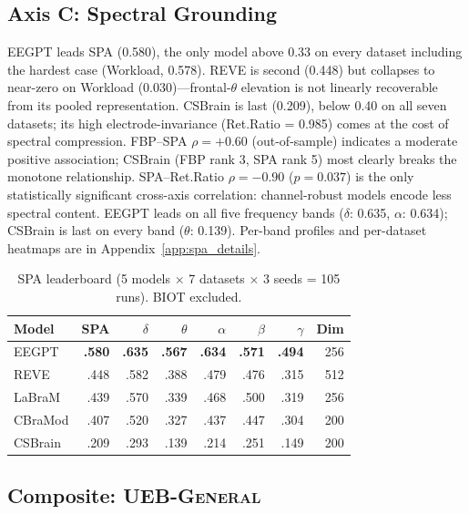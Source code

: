 \documentclass{article}
\newcommand{\uebgen}{\textsc{UEB-General}\xspace}
\begin{document}
\subsection{Axis C: Spectral Grounding}
\label{sec:results_c}

EEGPT leads SPA (0.580), the only model above 0.33 on every dataset including the hardest case (Workload, 0.578). REVE is second (0.448) but collapses to near-zero on Workload (0.030)---frontal-$\theta$ elevation is not linearly recoverable from its pooled representation. CSBrain is last (0.209), below 0.40 on all seven datasets; its high electrode-invariance (Ret.Ratio = 0.985) comes at the cost of spectral compression. FBP--SPA $\rho = +0.60$ (out-of-sample) indicates a moderate positive association; CSBrain (FBP rank 3, SPA rank 5) most clearly breaks the monotone relationship. SPA--Ret.Ratio $\rho = -0.90$ ($p = 0.037$) is the only statistically significant cross-axis correlation: channel-robust models encode less spectral content. EEGPT leads on all five frequency bands ($\delta$: 0.635, $\alpha$: 0.634); CSBrain is last on every band ($\theta$: 0.139). Per-band profiles and per-dataset heatmaps are in Appendix~\ref{app:spa_details}.

\begin{table}[t]
  \caption{SPA leaderboard (5 models $\times$ 7 datasets $\times$ 3 seeds = 105 runs). BIOT excluded.}
  \label{tab:spa}
  \centering
  \small
  \begin{tabular}{lrrrrrrr}
    \toprule
    Model & SPA & $\delta$ & $\theta$ & $\alpha$ & $\beta$ & $\gamma$ & Dim \\
    \midrule
    EEGPT & \textbf{.580} & \textbf{.635} & \textbf{.567} & \textbf{.634} & \textbf{.571} & \textbf{.494} & 256 \\
    REVE & .448 & .582 & .388 & .479 & .476 & .315 & 512 \\
    LaBraM & .439 & .570 & .339 & .468 & .500 & .319 & 256 \\
    CBraMod & .407 & .520 & .327 & .437 & .447 & .304 & 200 \\
    CSBrain & .209 & .293 & .139 & .214 & .251 & .149 & 200 \\
    \bottomrule
  \end{tabular}
\end{table}

\subsection{Composite: \uebgen}
\label{sec:results_composite}
\end{document}
